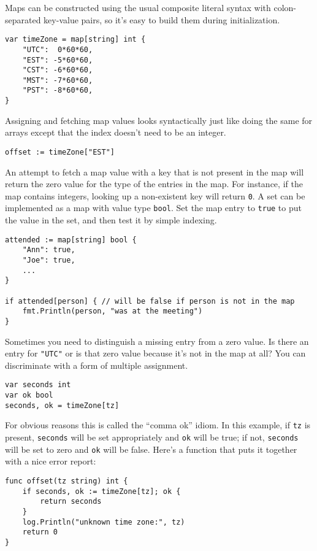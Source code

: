 Maps can be constructed using the usual composite literal syntax with
colon-separated key-value pairs, so it's easy to build them during
initialization.

\begin{Verbatim}[frame=single]
var timeZone = map[string] int {
    "UTC":  0*60*60,
    "EST": -5*60*60,
    "CST": -6*60*60,
    "MST": -7*60*60,
    "PST": -8*60*60,
}
\end{Verbatim}

Assigning and fetching map values looks syntactically just like doing
the same for arrays except that the index doesn't need to be an integer.

\begin{Verbatim}[frame=single]
offset := timeZone["EST"]
\end{Verbatim}

An attempt to fetch a map value with a key that is not present in the
map will return the zero value for the type of the entries in the map.
For instance, if the map contains integers, looking up a non-existent
key will return \texttt{0}. A set can be implemented as a map with value
type \texttt{bool}. Set the map entry to \texttt{true} to put the value
in the set, and then test it by simple indexing.

\begin{Verbatim}[frame=single]
attended := map[string] bool {
    "Ann": true,
    "Joe": true,
    ...
}

if attended[person] { // will be false if person is not in the map
    fmt.Println(person, "was at the meeting")
}
\end{Verbatim}

Sometimes you need to distinguish a missing entry from a zero value. Is
there an entry for \texttt{"UTC"} or is that zero value because it's not
in the map at all? You can discriminate with a form of multiple
assignment.

\begin{Verbatim}[frame=single]
var seconds int
var ok bool
seconds, ok = timeZone[tz]
\end{Verbatim}

For obvious reasons this is called the ``comma ok'' idiom. In this
example, if \texttt{tz} is present, \texttt{seconds} will be set
appropriately and \texttt{ok} will be true; if not, \texttt{seconds}
will be set to zero and \texttt{ok} will be false. Here's a function
that puts it together with a nice error report:

\begin{Verbatim}[frame=single]
func offset(tz string) int {
    if seconds, ok := timeZone[tz]; ok {
        return seconds
    }
    log.Println("unknown time zone:", tz)
    return 0
}
\end{Verbatim}

